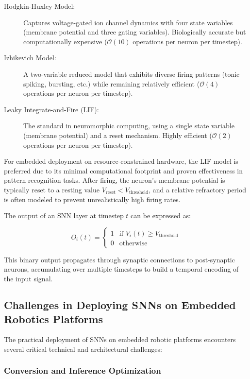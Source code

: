 \begin{description}
    \item[Hodgkin-Huxley Model:] Captures voltage-gated ion channel dynamics with four state variables 
    (membrane potential and three gating variables). Biologically accurate but computationally expensive 
    ($\mathcal{O}(10)$ operations per neuron per timestep).
    
    \item[Izhikevich Model:] A two-variable reduced model that exhibits diverse firing patterns (tonic spiking, 
    bursting, etc.) while remaining relatively efficient ($\mathcal{O}(4)$ operations per neuron per timestep).
    
    \item[Leaky Integrate-and-Fire (LIF):] The standard in neuromorphic computing, using a single state variable 
    (membrane potential) and a reset mechanism. Highly efficient ($\mathcal{O}(2)$ operations per neuron per timestep).
\end{description}

For embedded deployment on resource-constrained hardware, the LIF model is preferred due to its minimal computational 
footprint and proven effectiveness in pattern recognition tasks. After firing, the neuron's membrane potential is 
typically reset to a resting value $V_{\text{reset}} < V_{\text{threshold}}$, and a relative refractory period is 
often modeled to prevent unrealistically high firing rates.

The output of an SNN layer at timestep $t$ can be expressed as:

$$O_i(t) = \begin{cases} 1 & \text{if } V_i(t) \geq V_{\text{threshold}} \\ 0 & \text{otherwise} \end{cases}$$

This binary output propagates through synaptic connections to post-synaptic neurons, accumulating over multiple 
timesteps to build a temporal encoding of the input signal.


\subsection{Challenges in Deploying SNNs on Embedded Robotics Platforms}

The practical deployment of SNNs on embedded robotic platforms encounters
several critical technical and architectural challenges:

\subsubsection{Conversion and Inference Optimization}

